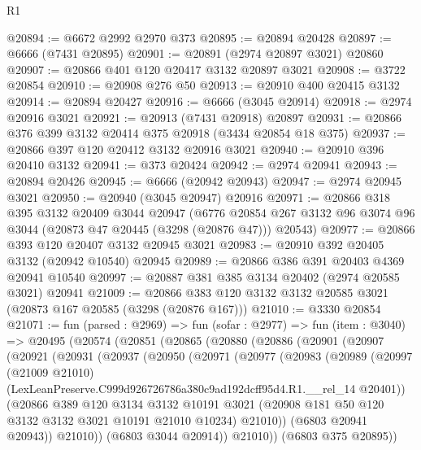 \begin{lexlean}{R1}
\begin{coremodule}
@20894 := @6672 @2992 @2970 @373
@20895 := @20894 @20428
@20897 := @6666 (@7431 @20895)
@20901 := @20891 (@2974 @20897 @3021) @20860
@20907 := @20866 @401 @120 @20417 @3132 @20897 @3021
@20908 := @3722 @20854
@20910 := @20908 @276 @50
@20913 := @20910 @400 @20415 @3132
@20914 := @20894 @20427
@20916 := @6666 (@3045 @20914)
@20918 := @2974 @20916 @3021
@20921 := @20913 (@7431 @20918) @20897
@20931 := @20866 @376 @399 @3132 @20414 @375 @20918 (@3434 @20854 @18 @375)
@20937 := @20866 @397 @120 @20412 @3132 @20916 @3021
@20940 := @20910 @396 @20410 @3132
@20941 := @373 @20424
@20942 := @2974 @20941
@20943 := @20894 @20426
@20945 := @6666 (@20942 @20943)
@20947 := @2974 @20945 @3021
@20950 := @20940 (@3045 @20947) @20916
@20971 := @20866
    @318
    @395
    @3132
    @20409
    @3044
    @20947
    (@6776 @20854 @267 @3132 @96 @3074 @96 @3044 (@20873 @47 @20445 (@3298 (@20876 @47))) @20543)
@20977 := @20866 @393 @120 @20407 @3132 @20945 @3021
@20983 := @20910 @392 @20405 @3132 (@20942 @10540) @20945
@20989 := @20866 @386 @391 @20403 @4369 @20941 @10540
@20997 := @20887 @381 @385 @3134 @20402 (@2974 @20585 @3021) @20941
@21009 := @20866 @383 @120 @3132 @3132 @20585 @3021 (@20873 @167 @20585 (@3298 (@20876 @167)))
@21010 := @3330 @20854
@21071 := fun (parsed : @2969) =>
  fun (sofar : @2977) =>
  fun (item : @3040) =>
  @20495
    (@20574
      (@20851
        (@20865
          (@20880
            (@20886
              (@20901
                (@20907
                  (@20921
                    (@20931
                      (@20937
                        (@20950
                          (@20971
                            (@20977
                              (@20983
                                (@20989
                                  (@20997
                                    (@21009 @21010)
                                    (LexLeanPreserve.C999d926726786a380c9ad192dcff95d4.R1.__rel_14
                                      @20401))
                                  (@20866
                                    @389
                                    @120
                                    @3134
                                    @3132
                                    @10191
                                    @3021
                                    (@20908 @181 @50 @120 @3132 @3132 @3021 @10191 @21010 @10234)
                                    @21010))
                                (@6803 @20941 @20943))
                              @21010))
                          (@6803 @3044 @20914))
                        @21010))
                    (@6803 @375 @20895))

\end{coremodule}
\end{lexlean}
